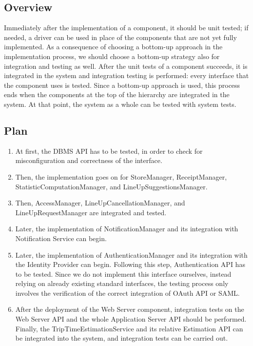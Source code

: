 \documentclass[../../main.tex]{subfiles}
\begin{document}
\subsection{Overview}

Immediately after the implementation of a component, it should be unit tested; if needed, a driver can be used in place of the components that are not yet fully implemented. 
As a consequence of choosing a bottom-up approach in the implementation process, we should choose a bottom-up strategy also for integration and testing as well. 
After the unit tests of a component succeeds, it is integrated in the system and integration testing is performed: every interface that the component uses is tested. Since a bottom-up approach is used, this process ends when the components at the top of the hierarchy are integrated in the system.
At that point, the system as a whole can be tested with system tests.

\subsection{Plan}

\begin{enumerate}

	\item At first, the DBMS API has to be tested, in order to check for misconfiguration and correctness of the interface.

	\item Then, the implementation goes on for StoreManager, ReceiptManager, StatisticComputationManager, and LineUpSuggestionsManager. 
	
\item Then, AccessManager, LineUpCancellationManager, and LineUpRequestManager are integrated and tested.
	\item Later, the implementation of NotificationManager and its integration with Notification Service can begin. 

	\item Later, the implementation of AuthenticationManager and its integration with the Identity Provider can begin. 
	Following this step, Authentication API has to be tested. Since we do not implement this interface ourselves, instead relying on already existing standard interfaces, the testing process only involves the verification of the correct integration of OAuth API or SAML.

	\item After the deployment of the Web Server component, integration tests on the Web Server API and the whole Application Server API should be performed. 
	Finally, the TripTimeEstimationService and its relative Estimation API can be integrated into the system, and integration tests can be carried out. 

\end{enumerate}
\end{document}
